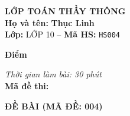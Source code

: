 \noindent
\begin{tcolorbox}[colback=white,colframe=black,arc=0mm,boxrule=0.8pt,top=4pt,bottom=4pt,left=6pt,right=6pt]
	\begin{minipage}[c]{0.44\textwidth}
		{\bfseries\large LỚP TOÁN THẦY THÔNG}\\[3pt]
		\textbf{Họ và tên:} \textbf{\large Thục Linh}\\[3pt]
		\textbf{Lớp:} LỚP 10 \quad -- \quad \textbf{Mã HS:} \texttt{HS004}
	\end{minipage}
	\hfill
	\begin{minipage}[c]{0.22\textwidth}
		\begin{tcolorbox}[colback=white,colframe=black,arc=0mm,boxrule=0.6pt,height=1.8cm,halign=center,valign=top,top=2pt]
			{\bfseries\normalsize Điểm}
		\end{tcolorbox}
	\end{minipage}
	\hfill
	\begin{minipage}[c]{0.30\textwidth}
		\raggedleft
		\textit{Thời gian làm bài: 30 phút}\\[4pt]
		\textbf{Mã đề thi:} 
	\end{minipage}
\end{tcolorbox}
\vspace{0.25cm}

\noindent\textbf{\large ĐỀ BÀI (MÃ ĐỀ: 004)}
\vspace{0.1cm}

